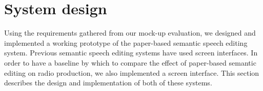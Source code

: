 






\section{System design}\label{sec:paper-design}





Using the requirements gathered from our mock-up evaluation, we designed and implemented a working prototype of the
paper-based semantic speech editing system.  Previous semantic speech editing systems have used screen interfaces. In
order to have a baseline by which to compare the effect of paper-based semantic editing on radio production, we also
implemented a screen interface. This section describes the design and implementation of both of these systems.


